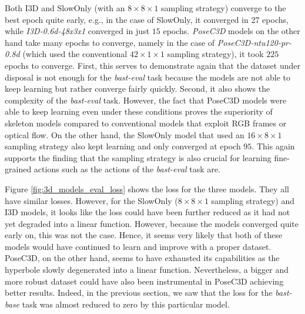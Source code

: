 \documentclass[extern,palatino]{cgMA}
\begin{document}
\bigskip
\noindent Both I3D and SlowOnly (with an $8 \times 8 \times 1$ sampling strategy) converge to the best epoch quite early, e.g., in the case of SlowOnly, it converged in 27 epochs, while \textit{I3D-0.6d-48x3x1} converged in just $15$ epochs. \textit{PoseC3D} models on the other hand take many epochs to converge, namely in the case of \textit{PoseC3D-ntu120-pr-0.8d} (which used the conventional $42 \times 1 \times 1$ sampling strategy), it took $225$ epochs to converge. First, this serves to demonstrate again that the dataset under disposal is not enough for the \textit{bast-eval} task because the models are not able to keep learning but rather converge fairly quickly. Second, it also shows the complexity of the \textit{bast-eval} task. However, the fact that PoseC3D models were able to keep learning even under these conditions proves the superiority of skeleton models compared to conventional models that exploit RGB frames or optical flow. On the other hand, the SlowOnly model that used an $16 \times 8 \times 1$ sampling strategy also kept learning and only converged at epoch $95$. This again supports the finding that the sampling strategy is also crucial for learning fine-grained actions such as the actions of the \textit{bast-eval} task are.

\bigskip
\noindent Figure \ref{fig:3d_models_eval_loss} shows the loss for the three models. They all have similar losses. However, for the SlowOnly ($8 \times 8 \times 1$ sampling strategy) and I3D models, it looks like the loss could have been further reduced as it had not yet degraded into a linear function. However, because the models converged quite early on, this was not the case. Hence, it seems very likely that both of these models would have continued to learn and improve with a proper dataset. PoseC3D, on the other hand, seems to have exhausted its capabilities as the hyperbole slowly degenerated into a linear function. Nevertheless, a bigger and more robust dataset could have also been instrumental in PoseC3D achieving better results. Indeed, in the previous section, we saw that the loss for the \textit{bast-base} task was almost reduced to zero by this particular model.
\end{document}

